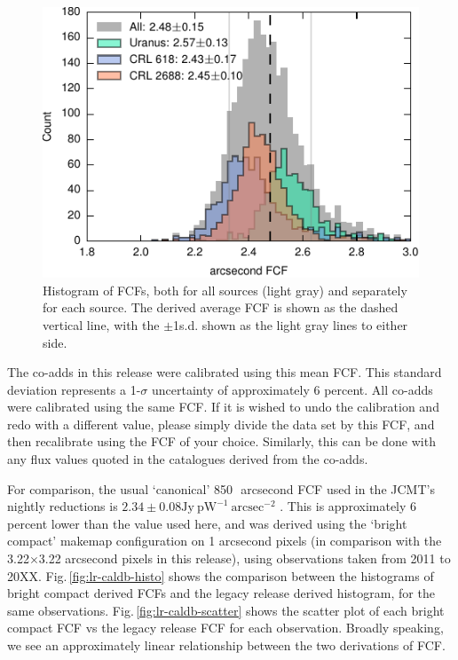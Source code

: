 \documentclass[twocolumn,times]{aastex6}
\begin{document}
\begin{figure}
  \centering
  \includegraphics{lrvalues-histo}
  \caption{Histogram of FCFs, both for all sources (light gray) and
    separately for each source. The derived average FCF is shown as
    the dashed vertical line, with the $\pm$1s.d. shown as the light
    gray lines to either side.}
  \label{fig:calibhist}
\end{figure}

The co-adds in this release were calibrated using this mean FCF.  This
standard deviation represents a 1-$\sigma$ uncertainty of
approximately 6 percent. All co-adds were calibrated using the same
FCF. If it is wished to undo the calibration and redo with a different
value, please simply divide the data set by this FCF, and then
recalibrate using the FCF of your choice. Similarly, this can be done
with any flux values quoted in the catalogues derived from the
co-adds.%

For comparison, the usual `canonical' 850\,\micron\ arcsecond FCF used
in the JCMT's nightly reductions is $2.34 \pm 0.08 \mathrm{Jy}\
\mathrm{pW}^{-1}\ \mathrm{arcsec}^{-2}$ \citep{Dempsey2013}. This is
approximately 6 percent lower than the value used here, and was
derived using the `bright compact' makemap configuration on 1
arcsecond pixels (in comparison with the 3.22$\times$3.22 arcsecond
pixels in this release), using observations taken from 2011 to
20XX. Fig.\,\ref{fig:lr-caldb-histo} shows the comparison between the
histograms of bright compact derived FCFs and the legacy release
derived histogram, for the same
observations. Fig.\,\ref{fig:lr-caldb-scatter} shows the scatter plot
of each bright compact FCF vs the legacy release FCF for each
observation. Broadly speaking, we see an approximately linear
relationship between the two derivations of FCF.
\end{document}
